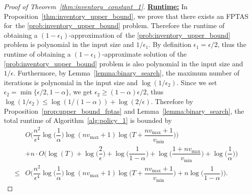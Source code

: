 \documentclass[mnsc,non-blindrev]{informs3}
\theoremstyle{definition}
\begin{document}
\begin{proof}[Proof of Theorem~\ref{thm:inventory_constant_1}]
\noindent\underline{\bf Runtime:} In Proposition~\ref{thm:inventory_upper_bound}, we prove that there exists an FPTAS for~the \ref{prob:inventory_upper_bound} problem. Therefore the runtime of obtaining a $(1-\epsilon_1)$-approximation of~the \ref{prob:inventory_upper_bound} problem is polynomial in the input size and $1/\epsilon_1$. By definition $\epsilon_1=\epsilon/2$, thus the runtime of obtaining a $(1-\epsilon_1)$-approximate solution of the \ref{prob:inventory_upper_bound} problem is also polynomial in the input size and $1/\epsilon$. Furthermore, by Lemma~\ref{lemma:binary_search}, the maximum number of iterations is polynomial in the input size and $\log(1/\epsilon_2)$. Since we set $\epsilon_2=\min\{\epsilon/2,1-\alpha\}$, we get $\epsilon_2\geq (1-\alpha)\epsilon/2$, thus $\log(1/\epsilon_2)\leq \log(1/(1-\alpha))+\log(2/\epsilon)$. Therefore by Proposition~\ref{prop:upper_bound_fptas} and Lemma~\ref{lemma:binary_search}, the total runtime of Algorithm~\ref{alg:policy_1} is bounded by 
\begin{align*}
&O\Big(\dfrac{n^2}{\epsilon^4}\log\Big(\dfrac{1}{\alpha}\Big)\log(nv_{\max}+1)\log\Big(T+\dfrac{nv_{\max}+1}{v_{\min}}\Big)\Big)\\
&+n\cdot O\Big(\log(T)+\log\Big(\dfrac{2}{\epsilon}\Big)+\log\Big(\dfrac{1}{1-\alpha}\Big)+\log\Big(\dfrac{1+nv_{\max}}{v_{\min}}\Big)+\log\Big(\dfrac{1}{\alpha}\Big)\Big)\\
\leq&O\Big(\dfrac{n^2}{\epsilon^4}\log\Big(\dfrac{1}{\alpha}\Big)\log(nv_{\max}+1)\log\Big(T+\dfrac{nv_{\max}+1}{v_{\min}}\Big)+n\log\Big(\dfrac{1}{1-\alpha}\Big)\Big).
\end{align*}



\end{proof}
\end{document}
